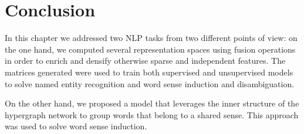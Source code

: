%
%
%






\section{Conclusion}
\label{chap6:conclusion}
In this chapter we addressed two NLP tasks from two different points of view: on the one hand, we computed several representation spaces using fusion operations in order to enrich and densify otherwise sparse and independent features. The matrices generated were used to train both supervised and unsupervised models to solve named entity recognition and word sense induction and disambiguation.

On the other hand, we proposed a model that leverages the inner structure of the hypergraph network to group words that belong to a shared sense. This approach was used to solve word sense induction.


